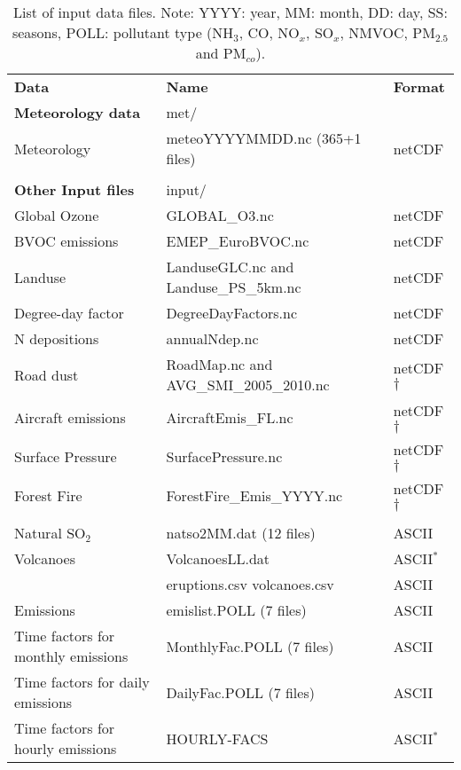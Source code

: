 \begin{table}
\caption[List of input data files]{List of input data files.
Note: YYYY: year, MM: month, DD: day, SS: seasons, POLL: pollutant
type (NH$_3$, CO, NO$_x$, SO$_x$, NMVOC,
PM$_{2.5}$ and PM$_{co}$). 
\label{Tab:inputdata}}
\begin{center}
\begin{small}
\begin{tabular}{lll}
\hline
{\bf Data} &  {\bf Name} & {\bf Format}\\
{\bf Meteorology data} & met/&  \\
Meteorology  &  meteoYYYYMMDD.nc \quad (365+1 files) & netCDF\\
& & \\
{\bf Other Input files} & input/ &\\
Global Ozone & GLOBAL\_O3.nc & netCDF\\
BVOC emissions & EMEP\_EuroBVOC.nc & netCDF\\
Landuse & LanduseGLC.nc and Landuse\_PS\_5km.nc  & netCDF\\
Degree-day factor & DegreeDayFactors.nc &  netCDF\\
N depositions & annualNdep.nc  & netCDF\\
Road dust &  RoadMap.nc and AVG\_SMI\_2005\_2010.nc& netCDF$\dagger$ \\
Aircraft emissions & AircraftEmis\_FL.nc & netCDF$\dagger$ \\
Surface Pressure & SurfacePressure.nc & netCDF$\dagger$ \\
Forest Fire & ForestFire\_Emis\_YYYY.nc & netCDF$\dagger$ \\
& & \\
Natural SO$_2$ & natso2MM.dat  \quad (12 files) & ASCII\\
Volcanoes & VolcanoesLL.dat & ASCII$^*$\\
	  & eruptions.csv volcanoes.csv& ASCII \\ 
Emissions & emislist.POLL  \quad (7 files) & ASCII\\
Time factors for monthly emissions& MonthlyFac.POLL  \quad (7 files) & ASCII\\
Time factors for daily emissions &  DailyFac.POLL  \quad (7 files) & ASCII\\
Time factors for hourly emissions & HOURLY-FACS  & ASCII$^*$\\

\end{tabular}
\end{small}
\end{center}
\end{table}
